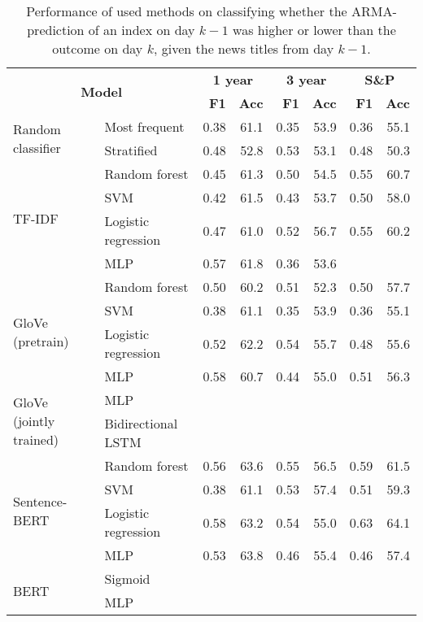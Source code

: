 \begin{table}[H]
    \centering
    \begin{tabular}{llrrrrrr}
    \hline
        \multicolumn{2}{c}{\multirow{2}{*}{\textbf{Model}}} & \multicolumn{2}{c}{\textbf{1 year}} & \multicolumn{2}{c}{\textbf{3 year}} & \multicolumn{2}{c}{\textbf{S\&P}} \\
      & & \textbf{F1} & \textbf{Acc} & \textbf{F1} & \textbf{Acc} & \textbf{F1} & \textbf{Acc} \\
        \hline \hline   
        \multirow{2}{*}{Random classifier} & Most frequent & 0.38 & 61.1 & 0.35 & 53.9 & 0.36 & 55.1 \\
        & Stratified & 0.48 & 52.8 & 0.53 & 53.1 & 0.48 & 50.3 \\
        \hline 
        \multirow{4}{*}{TF-IDF} & Random forest & 0.45 & 61.3 & 0.50 & 54.5 & 0.55 & 60.7 \\
        & SVM & 0.42 & 61.5 & 0.43 & 53.7 & 0.50 & 58.0 \\
        & Logistic regression & 0.47 & 61.0 & 0.52 & 56.7 & 0.55 & 60.2 \\
        & MLP & 0.57 & 61.8 & 0.36 & 53.6 & \\
        \hline 
        \multirow{4}{*}{GloVe (pretrain)} & Random forest & 0.50 & 60.2 & 0.51 & 52.3 & 0.50 & 57.7 \\
        & SVM & 0.38 & 61.1 & 0.35 & 53.9 & 0.36 & 55.1 \\
        & Logistic regression & 0.52 & 62.2 & 0.54 & 55.7 & 0.48 & 55.6  \\
        & MLP & 0.58 & 60.7 & 0.44 & 55.0 & 0.51 & 56.3 \\
        \hline 
        \multirow{2}{*}{GloVe (jointly trained)} & MLP & \\
        & Bidirectional LSTM & \\
        \hline 
        \multirow{4}{*}{Sentence-BERT} & Random forest & 0.56 & 63.6 & 0.55 & 56.5 & 0.59 & 61.5 \\
        & SVM & 0.38 & 61.1 & 0.53 & 57.4 & 0.51 & 59.3 \\
        & Logistic regression & 0.58 & 63.2 & 0.54 & 55.0 & 0.63 & 64.1 \\
        & MLP & 0.53 & 63.8 & 0.46 & 55.4 & 0.46 & 57.4 \\
        \hline
        \multirow{2}{*}{BERT} & Sigmoid & \\
        & MLP & \\ 
        \hline
    \end{tabular}
\caption{Performance of used methods on classifying whether the ARMA-prediction of an index on day $k-1$ was higher or lower than the outcome on day $k$, given the news titles from day $k-1$.}
\label{tab:-----}
\end{table}


